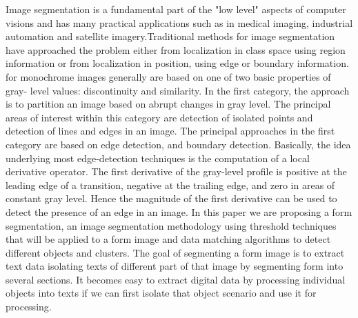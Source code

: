 Image segmentation is a fundamental part of the "low level" aspects of computer visions and has many practical applications such as in medical imaging, industrial automation and satellite imagery.Traditional methods for image segmentation have approached the problem either from localization in class space using region information or from localization in position, using edge or boundary information. for monochrome images generally are based on one of two basic properties of gray- level values: discontinuity and similarity. In the first category, the approach is to partition an image based on abrupt changes in gray level. The principal areas of interest within this category are detection of isolated points and detection of lines and edges in an image. The principal approaches in the first category are based on edge detection, and boundary detection. Basically, the idea underlying most edge-detection techniques is the computation of a local derivative operator. The first derivative of the gray-level profile is positive at the leading edge of a transition, negative at the trailing edge, and zero in areas of constant gray level. Hence the magnitude of the first derivative can be used to detect the presence of an edge in an image.
In this paper we are proposing a form segmentation, an image segmentation methodology using threshold techniques that will be applied to a form image and data matching algorithms to detect different objects and clusters.
The goal of segmenting a form image is to extract text data isolating texts of different part of that image by segmenting form into several sections. It becomes easy to extract digital data by processing individual objects into texts if we can first isolate that object scenario and use it for processing.


